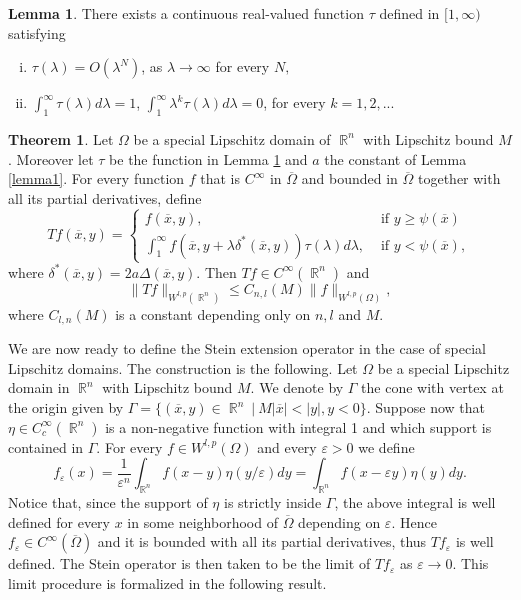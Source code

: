 \documentclass[12pt]{article}
\theoremstyle{definition}
\newtheorem{theorem}{Theorem}
\newtheorem{lemma}{Lemma}
\DeclareMathOperator\rr{\mathbb{R}}
\begin{document}
\begin{lemma}\label{lemma2}
There exists a continuous real-valued function $\tau$ defined in $[1,\infty)$ satisfying
\begin{enumerate}[i)]
	\item $\tau(\lambda)=O(\lambda^N)$, as $\lambda \rightarrow \infty$ for every $N,$
	\item $\int_1^\infty \tau(\lambda)d\lambda=1$, $\int_1^\infty \lambda^k\tau(\lambda)d\lambda=0$, for every $k=1,2,...$
\end{enumerate}
\end{lemma}


\begin{theorem}\label{defT}Let $\Omega$ be a special Lipschitz domain of $\rr^n$ with Lipschitz bound $M$. Moreover let $\tau$ be the function in Lemma \ref{lemma2} and $a$ the constant of Lemma \ref{lemma1}. For every function $f$ that is $C^\infty$ in $\overline \Omega$ and bounded in $\overline \Omega$ together with all its partial derivatives, define
\begin{equation} Tf(\overline x, y)= \begin{cases}
						f(\overline x, y), & \text{ if } y\ge\psi(\overline x) \\
						\int_1^\infty f(\overline x, y+ \lambda \delta^*(\overline x,y))\tau(\lambda)d\lambda, & \text{ if } y<\psi(\overline x),		
\end{cases}
\label{defT2}\end{equation}
where $\delta^*(\overline x,y)=2a\Delta(\overline x, y).$ Then $Tf \in C^\infty(\rr^n)$ and 
\[\| Tf\|_{W^{l,p}(\rr^n)}\le C_{n,l}(M) \| f\|_{W^{l,p}(\Omega)} ,\]
where $C_{l,n}(M)$ is a constant depending only on $n,l$ and $M.$
\end{theorem}

We are now ready to define the Stein extension operator in the case of special Lipschitz domains. The construction is the following. Let $\Omega$ be a special Lipschitz domain in $\rr^n$ with Lipschitz bound $M$. We denote by $\Gamma$ the cone with vertex at the origin given by $\Gamma=\{(\overline x, y) \in \rr^n \ | \ M |\overline x|<|y|, y<0 \}$. Suppose now that $\eta \in C^\infty_c(\rr^n)$ is a non-negative function with integral 1 and which support is contained in $\Gamma.$ For every $f \in W^{l,p}(\Omega)$ and every $\varepsilon>0$ we define
\[f_\varepsilon(x)=\frac{1}{\varepsilon^n}\int_{\rr^n} f(x-y) \eta(y/\varepsilon)dy =\int_{\rr^n} f(x-\varepsilon y) \eta(y)dy.\]
Notice that, since the support of $\eta$ is strictly inside $\Gamma$, the above integral is well defined for every $x$ in some neighborhood of $\overline \Omega$ depending on $\varepsilon$. Hence $f_\varepsilon \in C^\infty(\overline\Omega)$ and it is bounded with all its partial derivatives, thus $Tf_\varepsilon$ is well defined. The Stein operator is then taken to be the limit of $Tf_\varepsilon$ as $\varepsilon \to 0.$ This limit procedure is formalized in the following result.
\end{document}
